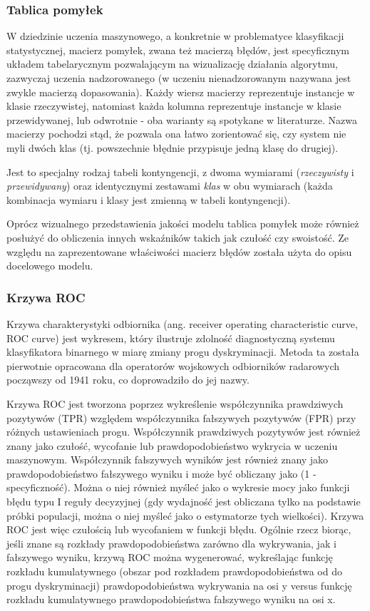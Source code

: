\documentclass[polish, twoside, 12pt, a4paper]{article}
\theoremstyle{definition}
\theoremstyle{plain}
\theoremstyle{remark}
\begin{document}
\subsubsection{Tablica pomyłek}

W dziedzinie uczenia maszynowego, a konkretnie w problematyce klasyfikacji statystycznej, macierz pomyłek, zwana też macierzą błędów, jest specyficznym układem tabelarycznym pozwalającym na wizualizację działania algorytmu, zazwyczaj uczenia nadzorowanego (w uczeniu nienadzorowanym nazywana jest zwykle macierzą dopasowania). Każdy wiersz macierzy reprezentuje instancje w klasie rzeczywistej, natomiast każda kolumna reprezentuje instancje w klasie przewidywanej, lub odwrotnie - oba warianty są spotykane w literaturze. Nazwa macierzy pochodzi stąd, że pozwala ona łatwo zorientować się, czy system nie myli dwóch klas (tj. powszechnie błędnie przypisuje jedną klasę do drugiej).

Jest to specjalny rodzaj tabeli kontyngencji, z dwoma wymiarami (\emph{rzeczywisty} i \emph{przewidywany}) oraz identycznymi zestawami \emph{klas} w obu wymiarach (każda kombinacja wymiaru i klasy jest zmienną w tabeli kontyngencji). \cite{powers2011}

Oprócz wizualnego przedstawienia jakości modelu tablica pomyłek może również posłużyć do obliczenia innych wskaźników takich jak czułość czy swoistość. Ze względu na zaprezentowane właściwości macierz błędów została użyta do opisu docelowego modelu.

\subsubsection{Krzywa ROC}

Krzywa charakterystyki odbiornika (ang. receiver operating characteristic curve, ROC curve) jest wykresem, który ilustruje zdolność diagnostyczną systemu klasyfikatora binarnego w miarę zmiany progu dyskryminacji. Metoda ta została pierwotnie opracowana dla operatorów wojskowych odbiorników radarowych począwszy od 1941 roku, co doprowadziło do jej nazwy.

Krzywa ROC jest tworzona poprzez wykreślenie współczynnika prawdziwych pozytywów (TPR) względem współczynnika fałszywych pozytywów (FPR) przy różnych ustawieniach progu. Współczynnik prawdziwych pozytywów jest również znany jako czułość, wycofanie lub prawdopodobieństwo wykrycia w uczeniu maszynowym. Współczynnik fałszywych wyników jest również znany jako prawdopodobieństwo fałszywego wyniku i może być obliczany jako (1 - specyficzność). Można o niej również myśleć jako o wykresie mocy jako funkcji błędu typu I reguły decyzyjnej (gdy wydajność jest obliczana tylko na podstawie próbki populacji, można o niej myśleć jako o estymatorze tych wielkości). Krzywa ROC jest więc czułością lub wycofaniem w funkcji błędu. Ogólnie rzecz biorąc, jeśli znane są rozkłady prawdopodobieństwa zarówno dla wykrywania, jak i fałszywego wyniku, krzywą ROC można wygenerować, wykreślając funkcję rozkładu kumulatywnego (obszar pod rozkładem prawdopodobieństwa od do progu dyskryminacji) prawdopodobieństwa wykrywania na osi y versus funkcję rozkładu kumulatywnego prawdopodobieństwa fałszywego wyniku na osi x.
\end{document}
